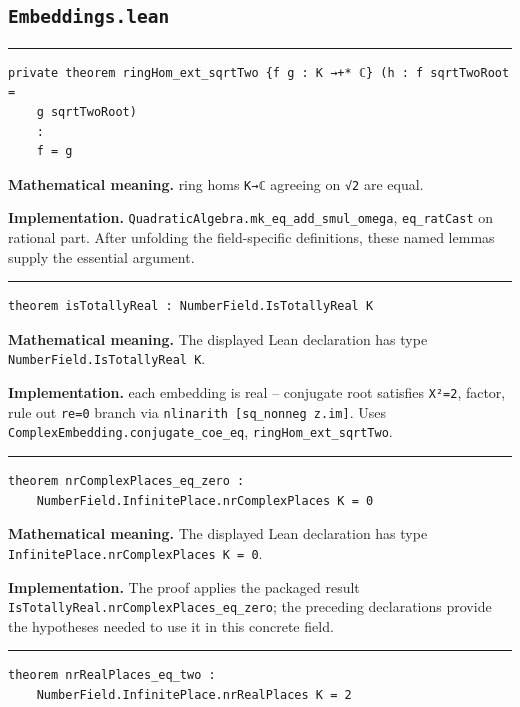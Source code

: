 \documentclass[UTF8,a4paper,11pt,fontset=fandol]{ctexart}
\theoremstyle{definition}
\newcommand{\statementsep}{\par\medskip\hrule\medskip}
\begin{document}
\subsection{\texttt{Embeddings.lean}}

\statementsep
\begin{verbatim}
private theorem ringHom_ext_sqrtTwo {f g : K →+* ℂ} (h : f sqrtTwoRoot =
    g sqrtTwoRoot)
    :
    f = g
\end{verbatim}
\noindent\textbf{Mathematical meaning.} ring homs \texttt{K→ℂ} agreeing on \texttt{√2} are equal.\par
\noindent\textbf{Implementation.} \texttt{QuadraticAlgebra.\allowbreak{}mk\_\allowbreak{}eq\_\allowbreak{}add\_\allowbreak{}smul\_\allowbreak{}omega}, \texttt{eq\_\allowbreak{}ratCast} on rational part. After unfolding the field-specific definitions, these named lemmas supply the essential argument.\par
\statementsep
\begin{verbatim}
theorem isTotallyReal : NumberField.IsTotallyReal K
\end{verbatim}
\noindent\textbf{Mathematical meaning.} The displayed Lean declaration has type \texttt{NumberField.\allowbreak{}IsTotallyReal K}.\par
\noindent\textbf{Implementation.} each embedding is real -- conjugate root satisfies \texttt{X²=2}, factor, rule out \texttt{re=0} branch via \texttt{nlinarith [sq\_\allowbreak{}nonneg z.\allowbreak{}im]}. Uses \texttt{ComplexEmbedding.\allowbreak{}conjugate\_\allowbreak{}coe\_\allowbreak{}eq}, \texttt{ringHom\_\allowbreak{}ext\_\allowbreak{}sqrtTwo}.\par
\statementsep
\begin{verbatim}
theorem nrComplexPlaces_eq_zero :
    NumberField.InfinitePlace.nrComplexPlaces K = 0
\end{verbatim}
\noindent\textbf{Mathematical meaning.} The displayed Lean declaration has type \texttt{InfinitePlace.\allowbreak{}nrComplexPlaces K = 0}.\par
\noindent\textbf{Implementation.} The proof applies the packaged result \texttt{IsTotallyReal.\allowbreak{}nrComplexPlaces\_\allowbreak{}eq\_\allowbreak{}zero}; the preceding declarations provide the hypotheses needed to use it in this concrete field.\par
\statementsep
\begin{verbatim}
theorem nrRealPlaces_eq_two :
    NumberField.InfinitePlace.nrRealPlaces K = 2
\end{verbatim}
\end{document}
